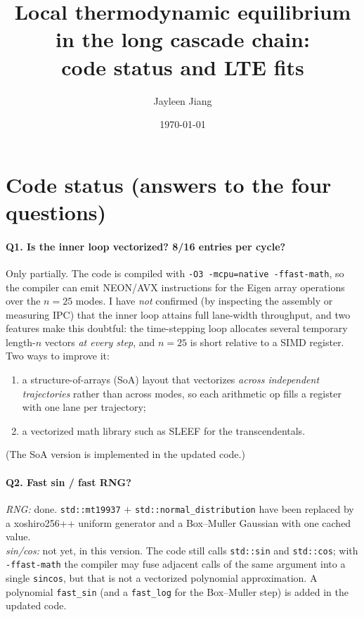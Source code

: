 \documentclass[11pt]{article}
\title{Local thermodynamic equilibrium in the long cascade chain:\\
code status and LTE fits}
\author{Jayleen Jiang}
\date{\today}
\begin{document}
\maketitle

\section*{Code status (answers to the four questions)}

\paragraph{Q1. Is the inner loop vectorized? 8/16 entries per cycle?}
Only partially. The code is compiled with \texttt{-O3 -mcpu=native -ffast-math},
so the compiler can emit NEON/AVX instructions for the Eigen array operations
over the $n=25$ modes. I have \emph{not} confirmed (by inspecting the assembly or
measuring IPC) that the inner loop attains full lane-width throughput, and two
features make this doubtful: the time-stepping loop allocates several temporary
length-$n$ vectors \emph{at every step}, and $n=25$ is short relative to a SIMD
register. Two ways to improve it:
\begin{enumerate}
\item a structure-of-arrays (SoA) layout that vectorizes \emph{across independent
trajectories} rather than across modes, so each arithmetic op fills a register
with one lane per trajectory;
\item a vectorized math library such as SLEEF for the transcendentals.
\end{enumerate}
(The SoA version is implemented in the updated code.)

\paragraph{Q2. Fast sin / fast RNG?}
\emph{RNG:} done. \texttt{std::mt19937} $+$ \texttt{std::normal\_distribution}
have been replaced by a xoshiro256++ uniform generator and a Box--Muller
Gaussian with one cached value.\\
\emph{sin/cos:} not yet, in this version. The code still calls \texttt{std::sin}
and \texttt{std::cos}; with \texttt{-ffast-math} the compiler may fuse adjacent
calls of the same argument into a single \texttt{sincos}, but that is not a
vectorized polynomial approximation. A polynomial \texttt{fast\_sin} (and a
\texttt{fast\_log} for the Box--Muller step) is added in the updated code.
\end{document}
